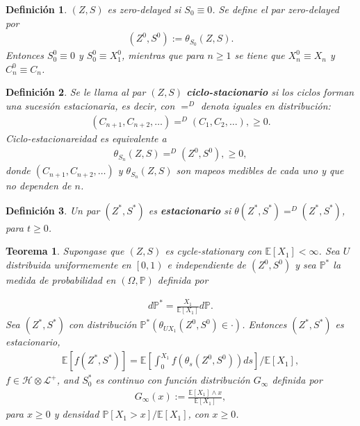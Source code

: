 \documentclass{article}
\newtheorem{Def}{Definición}[section]
\newtheorem{Teo}{Teorema}%
\newcommand{\esp}{\mathbb{E}}
\newcommand{\prob}{\mathbb{P}}
\numberwithin{equation}{section}
\begin{document}
\begin{Def}
$\left(Z,S\right)$ es \textit{zero-delayed} si $S_{0}\equiv0$. Se define el par \textit{zero-delayed} por
\begin{eqnarray}
\left(Z^{0},S^{0}\right):=\theta_{S_{0}}\left(Z,S\right).
\end{eqnarray}
Entonces $S_{0}^{0}\equiv0$ y $S_{0}^{0}\equiv X_{1}^{0}$, mientras que para $n\geq1$ se tiene que $X_{n}^{0}\equiv X_{n}$ y $C_{n}^{0}\equiv C_{n}$.
\end{Def}

\begin{Def}
Se le llama al par $\left(Z,S\right)$ \textbf{ciclo-stacionario} si los ciclos forman una sucesi\'on estacionaria, es decir, con $=^{D}$ denota iguales en distribuci\'on:
\begin{eqnarray}
\left(C_{n+1},C_{n+2},\ldots\right)=^{D}\left(C_{1},C_{2},\ldots\right),\geq0.
\end{eqnarray}
Ciclo-estacionareidad es equivalente a 
\begin{eqnarray}
\theta_{S_{n}}\left(Z,S\right)=^{D}
\left(Z^{0},S^{0}\right),\geq0,
\end{eqnarray}
donde $\left(C_{n+1},C_{n+2},\ldots\right)$ y $\theta_{S_{n}}\left(Z,S\right)$ son mapeos medibles de cada uno y que no dependen de $n$.
\end{Def}

\begin{Def}
Un par $\left(Z^{*},S^{*}\right)$ es \textbf{estacionario} si $\theta\left(Z^{*},S^{*}\right)=^{D}
\left(Z^{*},S^{*}\right)$, para $t\geq0$.
\end{Def}


\begin{Teo}\label{Teorema.2.1}
Supongase que $\left(Z,S\right)$ es cycle-stationary con $\esp\left[X_{1}\right]<\infty$. Sea $U$ distribuida uniformemente en $\left[0,1\right)$ e independiente de $\left(Z^{0},S^{0}\right)$ y sea $\prob^{*}$ la medida de probabilidad en $\left(\Omega,\prob\right)$ definida por 

\begin{eqnarray}
d\prob^{*}=\frac{X_{1}}{\esp\left[X_{1}\right]}d\prob.
\end{eqnarray}
 Sea $\left(Z^{*},S^{*}\right)$ con distribuci\'on $\prob^{*}\left(\theta_{UX_{1}}\left(Z^{0},S^{0}\right)\in\cdot\right)$. Entonces $\left(Z^{*},S^{*}\right)$ es estacionario,
\begin{eqnarray}
\esp\left[f\left(Z^{*},S^{*}\right)\right]=\esp\left[\int_{0}^{X_{1}}f\left(\theta_{s}\left(Z^{0},S^{0}\right)\right)ds\right]/\esp\left[X_{1}\right],
\end{eqnarray}
$f\in\mathcal{H}\otimes\mathcal{L}^{+}$, and $S_{0}^{*}$ es continuo con funci\'on distribuci\'on $G_{\infty}$ definida por 
\begin{eqnarray}
G_{\infty}\left(x\right):=\frac{\esp\left[X_{1}\right]\wedge x}{\esp\left[X_{1}\right]},
\end{eqnarray}
para $x\geq0$ y densidad $\prob\left[X_{1}>x\right]/\esp\left[X_{1}\right]$, con $x\geq0$.
\end{Teo}
\end{document}
